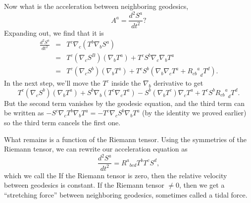Now what is the acceleration between neighboring geodesics,
$$A^a =\frac{d^2S^a}{dt^2}?$$
Expanding out, we find that it is
\begin{eqnarray*}
\frac{d^2S^a}{dt^2}&=&T^c \nabla_c(T^b \nabla_b S^a)\\
&=&T^c (\nabla_c S^B)(\nabla_b T^a)+T^c S^b \nabla_c \nabla_b T^a\\
&=& T^c(\nabla_c S^b)(\nabla_b T^a)+T^c S^b(\nabla_b \nabla_c T^a +{{R_{cb}}^a}_d T^d).
\end{eqnarray*}
In the next step, we'll move the $T^c$ inside the $\nabla_b$ derivative to get
$$T^c(\nabla_c S^b)(\nabla_b T^a)+S^b\nabla_b(T^c \nabla_c T^a) - S^b(\nabla_b T^c) \nabla_c T^a+T^c S^b{{R_{cb}}^a}_d T^d.$$
But the second term vanishes by the geodesic equation, and the third term can be written as
$-S^c \nabla_c T^b \nabla_b T^a = -T^c \nabla_c S^b \nabla_b T^a$ (by the identity we proved earlier) so the third term cancels the first one.

What remains is a function of the Riemann tensor. Using the symmetries of the Riemann tensor, we can rewrite our acceleration equation as
$$\frac{d^2S^a}{dt^2}={R^a}_{bcd} T^b T^c S^d,$$
which we call the  If the Riemann tensor is zero, then the relative velocity between geodesics is constant. If the Riemann tensor $\neq 0$, then we get a ``stretching force'' between neighboring geodesics, sometimes called a tidal force.